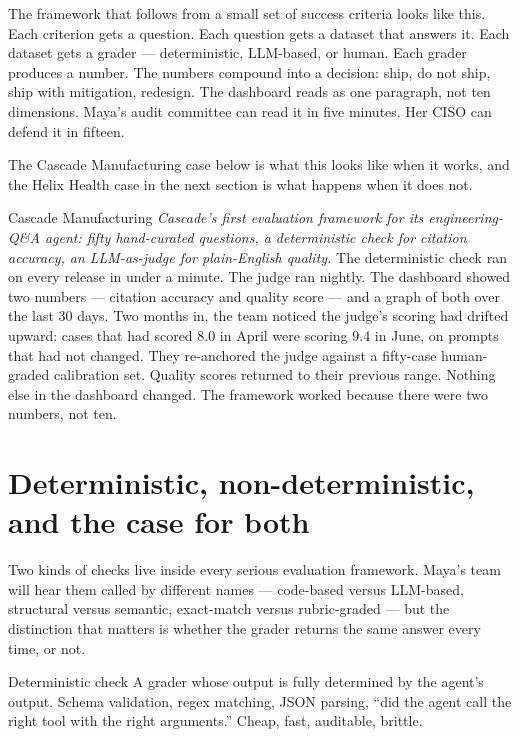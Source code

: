 The framework that follows from a small set of success criteria looks like this. Each criterion gets a question. Each question gets a dataset that answers it. Each dataset gets a grader --- deterministic, LLM-based, or human. Each grader produces a number. The numbers compound into a decision: ship, do not ship, ship with mitigation, redesign. The dashboard reads as one paragraph, not ten dimensions. Maya's audit committee can read it in five minutes. Her CISO can defend it in fifteen.

The Cascade Manufacturing case below is what this looks like when it works, and the Helix Health case in the next section is what happens when it does not.

\begin{TNinpractice}{Cascade Manufacturing}
\textit{Cascade's first evaluation framework for its engineering-Q\&A agent: fifty hand-curated questions, a deterministic check for citation accuracy, an LLM-as-judge for plain-English quality.} The deterministic check ran on every release in under a minute. The judge ran nightly. The dashboard showed two numbers --- citation accuracy and quality score --- and a graph of both over the last 30 days. Two months in, the team noticed the judge's scoring had drifted upward: cases that had scored 8.0 in April were scoring 9.4 in June, on prompts that had not changed. They re-anchored the judge against a fifty-case human-graded calibration set. Quality scores returned to their previous range. Nothing else in the dashboard changed. The framework worked because there were two numbers, not ten.
\end{TNinpractice}

\section{Deterministic, non-deterministic, and the case for both}

Two kinds of checks live inside every serious evaluation framework. Maya's team will hear them called by different names --- code-based versus LLM-based, structural versus semantic, exact-match versus rubric-graded --- but the distinction that matters is whether the grader returns the same answer every time, or not.

\begin{TNdefinition}{Deterministic check}
A grader whose output is fully determined by the agent's output. Schema validation, regex matching, JSON parsing, ``did the agent call the right tool with the right arguments.'' Cheap, fast, auditable, brittle.
\end{TNdefinition}

